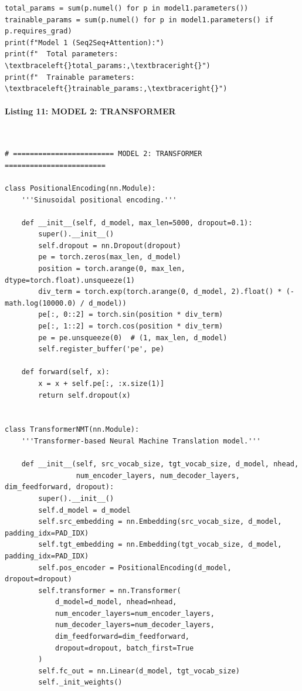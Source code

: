 \documentclass[12pt,a4paper,oneside]{report}
\begin{document}
\begin{Verbatim}[commandchars=\\\{\},breaklines=true,breakanywhere=true,fontsize=\scriptsize,frame=leftline,framesep=2mm,rulecolor=\color{gray}]
total_params = sum(p.numel() for p in model1.parameters())
trainable_params = sum(p.numel() for p in model1.parameters() if p.requires_grad)
print(f"Model 1 (Seq2Seq+Attention):")
print(f"  Total parameters: \textbraceleft{}total_params:,\textbraceright{}")
print(f"  Trainable parameters: \textbraceleft{}trainable_params:,\textbraceright{}")
\end{Verbatim}
\paragraph{Listing 11: MODEL 2: TRANSFORMER}\mbox{}\\[-1ex]
\begin{Verbatim}[commandchars=\\\{\},breaklines=true,breakanywhere=true,fontsize=\scriptsize,frame=leftline,framesep=2mm,rulecolor=\color{gray}]
# ======================== MODEL 2: TRANSFORMER ========================

class PositionalEncoding(nn.Module):
    '''Sinusoidal positional encoding.'''

    def __init__(self, d_model, max_len=5000, dropout=0.1):
        super().__init__()
        self.dropout = nn.Dropout(dropout)
        pe = torch.zeros(max_len, d_model)
        position = torch.arange(0, max_len, dtype=torch.float).unsqueeze(1)
        div_term = torch.exp(torch.arange(0, d_model, 2).float() * (-math.log(10000.0) / d_model))
        pe[:, 0::2] = torch.sin(position * div_term)
        pe[:, 1::2] = torch.cos(position * div_term)
        pe = pe.unsqueeze(0)  # (1, max_len, d_model)
        self.register_buffer('pe', pe)

    def forward(self, x):
        x = x + self.pe[:, :x.size(1)]
        return self.dropout(x)


class TransformerNMT(nn.Module):
    '''Transformer-based Neural Machine Translation model.'''

    def __init__(self, src_vocab_size, tgt_vocab_size, d_model, nhead,
                 num_encoder_layers, num_decoder_layers, dim_feedforward, dropout):
        super().__init__()
        self.d_model = d_model
        self.src_embedding = nn.Embedding(src_vocab_size, d_model, padding_idx=PAD_IDX)
        self.tgt_embedding = nn.Embedding(tgt_vocab_size, d_model, padding_idx=PAD_IDX)
        self.pos_encoder = PositionalEncoding(d_model, dropout=dropout)
        self.transformer = nn.Transformer(
            d_model=d_model, nhead=nhead,
            num_encoder_layers=num_encoder_layers,
            num_decoder_layers=num_decoder_layers,
            dim_feedforward=dim_feedforward,
            dropout=dropout, batch_first=True
        )
        self.fc_out = nn.Linear(d_model, tgt_vocab_size)
        self._init_weights()


\end{Verbatim}
\end{document}
